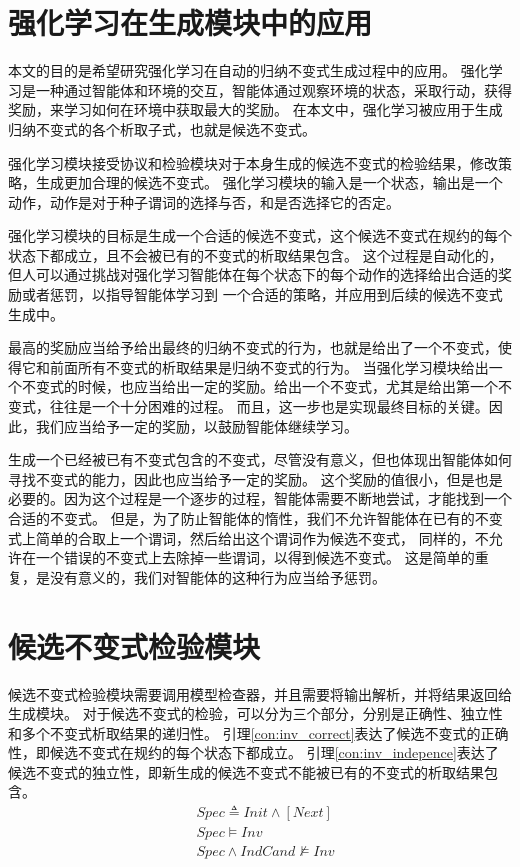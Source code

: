 \section{强化学习在生成模块中的应用}

本文的目的是希望研究强化学习在自动的归纳不变式生成过程中的应用。
强化学习是一种通过智能体和环境的交互，智能体通过观察环境的状态，采取行动，获得奖励，来学习如何在环境中获取最大的奖励。
在本文中，强化学习被应用于生成归纳不变式的各个析取子式，也就是候选不变式。

强化学习模块接受\TLA 协议和检验模块对于本身生成的候选不变式的检验结果，修改策略，生成更加合理的候选不变式。
强化学习模块的输入是一个状态，输出是一个动作，动作是对于种子谓词的选择与否，和是否选择它的否定。

强化学习模块的目标是生成一个合适的候选不变式，这个候选不变式在规约的每个状态下都成立，且不会被已有的不变式的析取结果包含。
这个过程是自动化的，但人可以通过挑战对强化学习智能体在每个状态下的每个动作的选择给出合适的奖励或者惩罚，以指导智能体学习到
一个合适的策略，并应用到后续的候选不变式生成中。

最高的奖励应当给予给出最终的归纳不变式的行为，也就是给出了一个不变式，使得它和前面所有不变式的析取结果是归纳不变式的行为。
当强化学习模块给出一个不变式的时候，也应当给出一定的奖励。给出一个不变式，尤其是给出第一个不变式，往往是一个十分困难的过程。
而且，这一步也是实现最终目标的关键。因此，我们应当给予一定的奖励，以鼓励智能体继续学习。

生成一个已经被已有不变式包含的不变式，尽管没有意义，但也体现出智能体如何寻找不变式的能力，因此也应当给予一定的奖励。
这个奖励的值很小，但是也是必要的。因为这个过程是一个逐步的过程，智能体需要不断地尝试，才能找到一个合适的不变式。
但是，为了防止智能体的惰性，我们不允许智能体在已有的不变式上简单的合取上一个谓词，然后给出这个谓词作为候选不变式，
同样的，不允许在一个错误的不变式上去除掉一些谓词，以得到候选不变式。
这是简单的重复，是没有意义的，我们对智能体的这种行为应当给予惩罚。


\section{候选不变式检验模块}

候选不变式检验模块需要调用模型检查器，并且需要将输出解析，并将结果返回给生成模块。
对于候选不变式的检验，可以分为三个部分，分别是正确性、独立性和多个不变式析取结果的递归性。
引理\ref{con:inv_correct}表达了候选不变式的正确性，即候选不变式在规约的每个状态下都成立。
引理\ref{con:inv_indepence}表达了候选不变式的独立性，即新生成的候选不变式不能被已有的不变式的析取结果包含。
\begin{align}
    &Spec \triangleq Init \wedge [Next] \\
    &Spec \vDash Inv \label{con:inv_correct} \\
    &Spec \wedge IndCand \nvDash Inv \label{con:inv_indepence}
\end{align}

